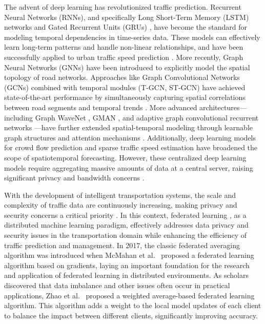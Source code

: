 \documentclass[pdflatex,sn-mathphys-num]{sn-jnl}
\theoremstyle{thmstyleone}
\theoremstyle{thmstyletwo}
\theoremstyle{thmstylethree}
\begin{document}
The advent of deep learning \cite{goodfellow2016deep,lecun2015deep} has revolutionized traffic prediction. Recurrent Neural Networks (RNNs), and specifically Long Short-Term Memory (LSTM) networks \cite{hochreiter1997lstm} and Gated Recurrent Units (GRUs) \cite{cho2014gru}, have become the standard for modeling temporal dependencies in time-series data. These models can effectively learn long-term patterns and handle non-linear relationships, and have been successfully applied to urban traffic speed prediction \cite{ma2015long,lv2015traffic}. More recently, Graph Neural Networks (GNNs) have been introduced to explicitly model the spatial topology of road networks. Approaches like Graph Convolutional Networks (GCNs) \cite{kipf2017gcn} combined with temporal modules (T-GCN, ST-GCN) \cite{chen2021tgcn} have achieved state-of-the-art performance by simultaneously capturing spatial correlations between road segments and temporal trends \cite{li2018dcrnn}. More advanced architectures---including Graph WaveNet \cite{wu2019gwnet}, GMAN \cite{zheng2020gman}, and adaptive graph convolutional recurrent networks \cite{bai2020adaptive}---have further extended spatial-temporal modeling through learnable graph structures and attention mechanisms \cite{vaswani2017attention}. Additionally, deep learning models for crowd flow prediction \cite{yao2018deep,zhang2017deep} and sparse traffic speed estimation \cite{wang2020traffic} have broadened the scope of spatiotemporal forecasting. However, these centralized deep learning models require aggregating massive amounts of data at a central server, raising significant privacy and bandwidth concerns \cite{liu2020fedgru}.

With the development of intelligent transportation systems, the scale and complexity of traffic data are continuously increasing, making privacy and security concerns a critical priority \cite{tariq2024trustworthy,bharati2022federated}. In this context, federated learning \cite{konecny2016federated}, as a distributed machine learning paradigm, effectively addresses data privacy and security issues in the transportation domain while enhancing the efficiency of traffic prediction and management. In 2017, the classic federated averaging algorithm was introduced when McMahan et al.\ \cite{mcmahan2017fedavg} proposed a federated learning algorithm based on gradients, laying an important foundation for the research and application of federated learning in distributed environments. As scholars discovered that data imbalance and other issues often occur in practical applications, Zhao et al.\ \cite{Zhao2018FederatedNonIID} proposed a weighted average-based federated learning algorithm. This algorithm adds a weight to the local model updates of each client to balance the impact between different clients, significantly improving accuracy.
\end{document}
